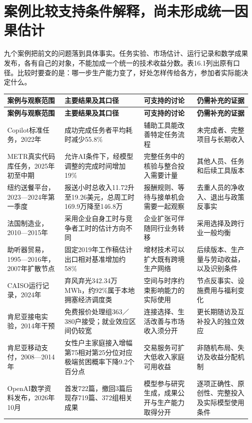 \documentclass[UTF8,fontset=windows,12pt,a4paper,oneside,openany]{ctexbook}
\begin{document}
\section{案例比较支持条件解释，尚未形成统一因果估计}

九个案例把前文的问题落到具体事实。任务实验、市场估计、运行记录和数学成果发布，各有自己的对象，不能加成一个统一的技术收益分数。表16.1列出原有口径。比较时要查的是：哪一步生产能力变了，好处怎样传给各方，参加者实际能决定什么。

\begingroup\footnotesize\setlength{\tabcolsep}{4pt}\renewcommand{\arraystretch}{1.25}
\begin{longtable}{>{\raggedright\arraybackslash}p{}>{\raggedright\arraybackslash}p{}>{\raggedright\arraybackslash}p{}>{\raggedright\arraybackslash}p{}}
\toprule
\textbf{案例与观察范围} & \textbf{主要结果及其口径} & \textbf{可支持的讨论} & \textbf{仍需补充的证据} \\
\midrule\endfirsthead
\toprule
\textbf{案例与观察范围} & \textbf{主要结果及其口径} & \textbf{可支持的讨论} & \textbf{仍需补充的证据} \\
\midrule\endhead
\bottomrule\endfoot
Copilot标准任务，2022年 & 成功完成任务者平均耗时减少55.8\% & 辅助工具能改善特定任务流程 & 未完成者、完整项目与长期收入 \\
METR真实代码库任务，2025年初至中期 & 允许AI条件下，经模型调整的完成时间增加19\% & 完整任务中的核验与整合投入需要计量 & 其他人员、任务和后续工具版本 \\
纽约送餐平台，2023—2024年第一季度 & 报送小时总收入11.72升至19.26美元，总周工时169.9万降至146.8万 & 报酬规则、等待与接单机会需要一起观察 & 去重人员的净收入、退出与政策反事实 \\
法国制造业，2010—2015年 & 采用企业自身工时与竞争者工时的估计方向不同 & 企业扩张可伴随同行业务转移 & 采用选择及跨行业一般均衡 \\
助听器贸易，1995—2016年，2007年扩散节点 & 固定2019年工作稿估计出口相对基准增加约58\% & 增材技术可以扩大既有跨境生产网络 & 后续版本、生产量与劳动收益，以及识别条件 \\
CAISO运行记录，2024年 & 弃风弃光342.34万MWh，约92\%属于本地拥塞经济调度类 & 空间与时序约束影响能力的实际使用 & 节点反事实、设施费用与福利变化 \\
肯尼亚接电实验，2014年干预 & 免费报价处理组363／380户接受；就业效应区间仍较宽 & 连接选择、生活改善与市场收入须分开 & 更长期随访及互补投入的独立效应 \\
肯尼亚移动支付，2008—2014年 & 女性户主家庭接入增幅第75相对第25分位对应极端贫困概率下降9.2个百分点 & 交易服务可扩大低收入家庭可用收益 & 非随机布局、失访及收益分配机制 \\
OpenAI数学资料发布，2026年10月 & 首发722篇，撤回3篇后现存719篇、372组相关成果 & 模型参与研究生成，成果公开与生产能力取得分开 & 逐项正确性、原创性、完整投入及实际模型使用条件 \\
\end{longtable}\endgroup
\end{document}
